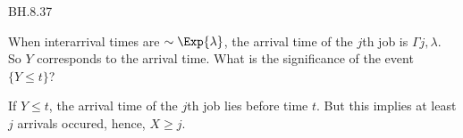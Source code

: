 
\setcounter{theorem}{36}
\begin{exercise} BH.8.37
\begin{hint}
When interarrival times are $\sim \Exp{\lambda}$, the arrival time of the $j$th job is $\Gamma{j, \lambda}$. So  $Y$ corresponds to the arrival time. What is the significance of the event $\{Y\leq t\}$?
\end{hint}
\begin{solution}
If $Y\leq t$, the arrival time of the $j$th job lies before time $t$. But this implies at least $j$ arrivals occured, hence, $X\geq j$.
\end{solution}

\end{exercise}

